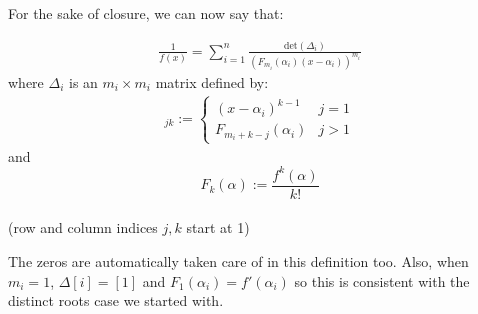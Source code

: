 \documentclass{article}
\begin{document}
For the sake of closure, we can now say that:
\begin{tcolorbox}
\begin{align}
    \frac{1}{f(x)} = \sum_{i=1}^{n} \frac{\textrm{det}(\Delta_i)}{\left(F_{m_i}(\alpha_i)(x-\alpha_i)\right)^{m_i}} \label{repeated}
\end{align}
where $\Delta_i$ is an $m_i \times m_i$ matrix defined by:
\begin{align}
    [\Delta_i]_{jk} := \begin{cases}(x-\alpha_i)^{k-1} & j = 1 \\ F_{m_i+k-j}(\alpha_i) & j>1\end{cases} \nonumber
\end{align}
and $$F_k(\alpha) := \frac{f^k(\alpha)}{k!}$$
\\(row and column indices $j,k$ start at 1)
\end{tcolorbox}

The zeros are automatically taken care of in this definition too. Also, when $m_i = 1$, $\Delta[i] = [1]$ and $F_1(\alpha_i) = f'(\alpha_i)$ so this is consistent with the distinct roots case we started with.

\end{document}

